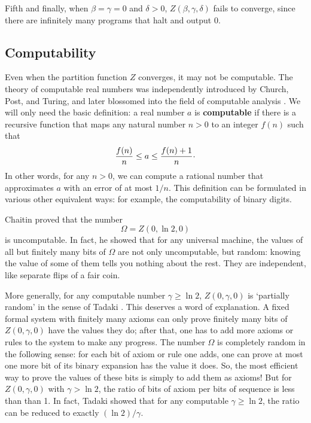 \documentclass[12pt,twoside,openright]{report}
\begin{document}
Fifth and finally, when $\beta = \gamma = 0$ and $\delta > 0$, 
$Z(\beta,\gamma,\delta)$ fails to converge, since there are infinitely many programs that halt and output 0.

\subsection{Computability} \label{computability}

Even when the partition function $Z$ converges, it may not be computable.  The theory of computable real numbers was independently introduced by Church, Post, and Turing, and later blossomed into the field of computable analysis \cite{PourElRichards}. We will only need the basic definition: a real number $a$ is {\bf computable} if there is a recursive function that maps any natural number $n > 0$ to an integer $f(n)$ such that
\[              \frac{f(n)}{n} \le a \le \frac{f(n)+1}{n}  \raisebox{0.4ex}{.}\]
In other words, for any $n > 0$, we can compute a rational number that approximates $a$ with an error of at most $1/n$.  This definition can be formulated in various other equivalent ways: for example, the computability of binary digits.

Chaitin \cite{Chaitin1975} proved that the number
\[     \Omega = Z(0,\ln 2, 0)  \]
is uncomputable.  In fact, he showed that for any universal machine, the values of all but finitely many bits of $\Omega$ are not only uncomputable, but random: knowing the value of some of them tells you nothing about the rest.  They are independent, like separate flips of a fair coin.

More generally, for any computable number $\gamma \ge \ln 2$, 
$Z(0,\gamma,0)$ is `partially random' in the sense of Tadaki \cite{CST2004,Tadaki2002}. This deserves a word of explanation.  A fixed formal system with finitely many axioms can only prove finitely many bits of 
$Z(0,\gamma,0)$ have the values they do; after that, one has to add more axioms or rules to the system to make any progress. The number $\Omega$ is completely random in the following sense:
for each bit of axiom or rule one adds, one can prove at most one more bit of its binary expansion has the value it does.  So, the most efficient way to prove the values of these bits is simply to add them as axioms!  But for $Z(0,\gamma,0)$ with $\gamma > \ln 2$, the ratio of bits of axiom per bits of sequence is less than than 1. In fact, Tadaki showed that for any computable $\gamma \ge \ln 2$, the ratio can be reduced to exactly $(\ln 2)/\gamma$.
\end{document}
